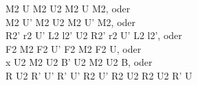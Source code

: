 M2 U M2 U2 M2 U M2, oder\\
M2 U' M2 U2 M2 U' M2, oder\\
R2' r2 U' L2 l2' U2 R2' r2 U' L2 l2', oder\\
F2 M2 F2 U' F2 M2 F2 U, oder\\
x U2 M2 U2 B' U2 M2 U2 B, oder\\
R U2 R' U' R' U' R2 U' R2 U2 R2 U2 R' U\\
